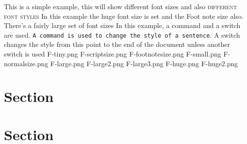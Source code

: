 This is a simple example, {\tiny this will show different font sizes} and also \textsc{different font styles}
In this example the {\huge huge font size} is set and 
the {\footnotesize Foot note size also}. There's a fairly 
large set of font sizes
In this example, a command and a switch are used. 
\texttt{A command is used to change the style 
of a sentence}.
\sffamily
A switch changes the style from this point to 
the end of the document unless another switch is used
\renewcommand{\familydefault}{\sfdefault}
\renewcommand{\familydefault}{\rmdefault}
\tiny	F-tiny.png
\scriptsize	F-scriptsize.png
\footnotesize	F-footnotesize.png
\small	F-small.png
\normalsize	F-normalsize.png
\large	F-large.png
\Large	F-large2.png
\LARGE	F-large3.png
\huge	F-huge.png
\Huge	F-huge2.png










\section{Section}
\section{Section}
